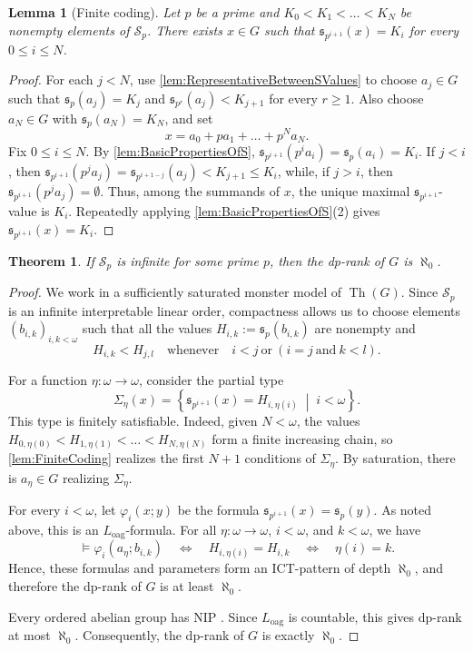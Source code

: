 \documentclass{article}
\theoremstyle{definition}
\theoremstyle{remark}
\theoremstyle{plain}
\newtheorem{thm}[dfn]{Theorem}
\newtheorem{lem}[dfn]{Lemma}
\begin{document}
\begin{lem}[Finite coding]\label{lem:FiniteCoding}
	Let $p$ be a prime and $K_0<K_1<\dots<K_N$ be nonempty elements of $\mathcal{S}_p$.
	There exists $x\in G$ such that $\mathfrak{s}_{p^{i+1}}(x)=K_i$ for every $0\leq i\leq N$.
\end{lem}

\begin{proof}
	For each $j<N$, use \autoref{lem:RepresentativeBetweenSValues} to choose $a_j\in G$ such that $\mathfrak{s}_p(a_j)=K_j$ and $\mathfrak{s}_{p^r}(a_j)<K_{j+1}$ for every $r\geq 1$.
	Also choose $a_N\in G$ with $\mathfrak{s}_p(a_N)=K_N$, and set
	\[
		x=a_0+pa_1+\dots+p^Na_N.
	\]
	Fix $0\leq i\leq N$.
	By \autoref{lem:BasicPropertiesOfS}, $\mathfrak{s}_{p^{i+1}}(p^ia_i)=\mathfrak{s}_p(a_i)=K_i$.
	If $j<i$, then $\mathfrak{s}_{p^{i+1}}(p^ja_j)=\mathfrak{s}_{p^{i+1-j}}(a_j)<K_{j+1}\leq K_i$, while, if $j>i$, then $\mathfrak{s}_{p^{i+1}}(p^ja_j)=\emptyset$.
	Thus, among the summands of $x$, the unique maximal $\mathfrak{s}_{p^{i+1}}$-value is $K_i$.
	Repeatedly applying \autoref{lem:BasicPropertiesOfS}(2) gives $\mathfrak{s}_{p^{i+1}}(x)=K_i$.
\end{proof}

\begin{thm}\label{thm:InfiniteSpine}
	If $\mathcal{S}_p$ is infinite for some prime $p$, then the dp-rank of $G$ is $\aleph_0$.
\end{thm}

\begin{proof}
	We work in a sufficiently saturated monster model of $\operatorname{Th}(G)$.
	Since $\mathcal{S}_p$ is an infinite interpretable linear order, compactness allows us to choose elements $(b_{i,k})_{i,k<\omega}$ such that all the values $H_{i,k}:=\mathfrak{s}_p(b_{i,k})$ are nonempty and
	\[
		H_{i,k}<H_{j,l}
		\quad\text{whenever}\quad
		i<j
		\ \text{or}\
		(i=j\ \text{and}\ k<l).
	\]

	For a function $\eta:\omega\to\omega$, consider the partial type
	\[
		\Sigma_\eta(x)
		=
		\left\{
			\mathfrak{s}_{p^{i+1}}(x)=H_{i,\eta(i)}
			\;\middle|\;
			i<\omega
		\right\}.
	\]
	This type is finitely satisfiable.
	Indeed, given $N<\omega$, the values $H_{0,\eta(0)}<H_{1,\eta(1)}<\dots<H_{N,\eta(N)}$ form a finite increasing chain, so \autoref{lem:FiniteCoding} realizes the first $N+1$ conditions of $\Sigma_\eta$.
	By saturation, there is $a_\eta\in G$ realizing $\Sigma_\eta$.

	For every $i<\omega$, let $\varphi_i(x;y)$ be the formula $\mathfrak{s}_{p^{i+1}}(x)=\mathfrak{s}_p(y)$.
	As noted above, this is an $L_{\mathrm{oag}}$-formula.
	For all $\eta:\omega\to\omega$, $i<\omega$, and $k<\omega$, we have
	\[
		\models\varphi_i(a_\eta;b_{i,k})
		\quad\Longleftrightarrow\quad
		H_{i,\eta(i)}=H_{i,k}
		\quad\Longleftrightarrow\quad
		\eta(i)=k.
	\]
	Hence, these formulas and parameters form an ICT-pattern of depth $\aleph_0$, and therefore the dp-rank of $G$ is at least $\aleph_0$.

	Every ordered abelian group has NIP \cite{Gurevich1984TheOrd}.
	Since $L_{\mathrm{oag}}$ is countable, this gives dp-rank at most $\aleph_0$.
	Consequently, the dp-rank of $G$ is exactly $\aleph_0$.
\end{proof}
\end{document}

